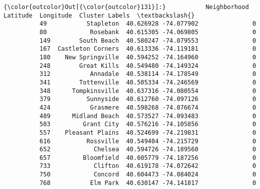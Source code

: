 \documentclass[11pt]{article}
\begin{document}
\begin{Verbatim}[commandchars=\\\{\}]
{\color{outcolor}Out[{\color{outcolor}131}]:}           Neighborhood   Latitude  Longitude  Cluster Labels  \textbackslash{}
          49           Stapleton  40.626928 -74.077902               0   
          80            Rosebank  40.615305 -74.069805               0   
          149        South Beach  40.580247 -74.079553               0   
          167  Castleton Corners  40.613336 -74.119181               0   
          180    New Springville  40.594252 -74.164960               0   
          248        Great Kills  40.549480 -74.149324               0   
          312           Annadale  40.538114 -74.178549               0   
          341        Tottenville  40.505334 -74.246569               0   
          348      Tompkinsville  40.637316 -74.080554               0   
          379          Sunnyside  40.612760 -74.097126               0   
          424           Grasmere  40.598268 -74.076674               0   
          489      Midland Beach  40.573527 -74.093483               0   
          503         Grant City  40.576216 -74.105856               0   
          557    Pleasant Plains  40.524699 -74.219831               0   
          616          Rossville  40.549404 -74.215729               0   
          652            Chelsea  40.594726 -74.189560               0   
          657         Bloomfield  40.605779 -74.187256               0   
          733            Clifton  40.619178 -74.072642               0   
          750            Concord  40.604473 -74.084024               0   
          768           Elm Park  40.630147 -74.141817               0   
          

\end{Verbatim}
\end{document}
